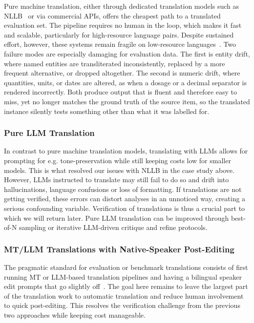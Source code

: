 Pure machine translation, either through dedicated translation models such as
NLLB~\cite{team2022no-2f4} or via commercial APIs, offers the cheapest path to
a translated evaluation set. The pipeline requires no human in the loop, which
makes it fast and scalable, particularly for high-resource language pairs.
Despite sustained effort, however, these systems remain fragile on
low-resource languages~\cite{team2022no-2f4, communication2023seamless-bb0}.
Two failure modes are especially damaging for evaluation data. The first is
entity drift, where named entities are transliterated inconsistently, replaced
by a more frequent alternative, or dropped altogether. The second is numeric
drift, where quantities, units, or dates are altered, as when a dosage or a
decimal separator is rendered incorrectly. Both produce output that is fluent
and therefore easy to miss, yet no longer matches the ground truth of the
source item, so the translated instance silently tests something other than
what it was labelled for.

\subsubsection{Pure LLM Translation}
In contrast to pure machine translation models, translating with LLMs allows for prompting for e.g. tone-preservation while still keeping costs low for smaller models. This is what resolved our issues with NLLB in the case study above. However, LLMs instructed to translate may still fail to do so and drift into hallucinations, language confusions or loss of formatting. If translations are not getting verified, these errors can distort analyses in an unnoticed way, creating a serious confounding variable. Verification of translations is thus a crucial part to which we will return later. Pure LLM translation can be improved through best-of-N sampling or iterative LLM-driven critique and refine protocols. 

\subsubsection{MT/LLM Translations with Native-Speaker Post-Editing}
The pragmatic standard for evaluation or benchmark translations consists of first running MT or LLM-based translation pipelines and having a bilingual speaker edit prompts that go slightly off~\cite{xuan2025mmlu-prox-307, ahuja2023mega-415}. The goal here remains to leave the largest part of the translation work to automatic translation and reduce human involvement to quick post-editing. This resolves the verification challenge from the previous two approaches while keeping cost manageable. 

